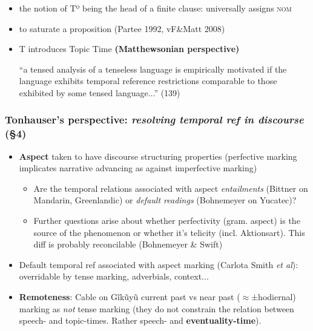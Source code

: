 \documentclass[10pt]{article}
\begin{document}
\begin{itemize}
	\item the notion of Tº being the head of a finite clause: universally assigns \textsc{nom}
	\item to saturate a proposition (Partee 1992, vF\&Matt 2008)
	\item T introduces Topic Time \textbf{(Matthewsonian perspective)}
	
	``a tensed analysis of a tenseless language is empirically motivated if the language exhibits temporal reference restrictions comparable to those exhibited by some tensed language...'' (139)
\end{itemize}

\subsubsection*{Tonhauser's perspective: \textit{resolving temporal ref in discourse} (§4)}

\begin{itemize}
	\item \textbf{Aspect} taken to have discourse structuring properties (perfective marking implicates narrative advancing as against imperfective marking)
		\begin{itemize}
		\item Are the temporal relations associated with aspect \textit{entailments} (Bittner on Mandarin, Greenlandic) or \textit{default readings} (Bohnemeyer on Yucatec)?
		\item Further questions arise about whether perfectivity (gram. aspect) is the source of the phenomenon or whether it's telicity (incl. Aktionsart). This diff is probably reconcilable (Bohnemeyer \& Swift)\end{itemize}
	\item Default temporal ref associated with aspect marking (Carlota Smith \textit{et al}): overridable by tense marking, adverbials, context...
	\item \textbf{Remoteness}: Cable on Gĩkũyũ current past vs near past ($\approx$±hodiernal) marking as \textit{not} tense marking (they do not constrain the relation between speech- and topic-times. Rather speech- and \textbf{eventuality-time}).
\end{itemize}
\end{document}
